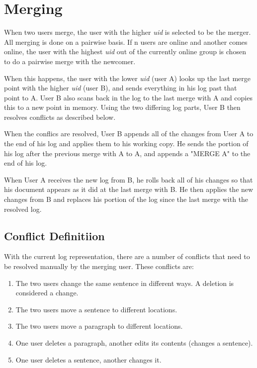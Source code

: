 \section{Merging}

When two users merge, the user with the higher \emph{uid} is selected to be
the merger. All merging is done on a pairwise basis. If n users are online 
and another comes online, the user with the highest \emph{uid} out of the currently
online group is chosen to do a pairwise merge with the newcomer.

When this happens, the user with the lower \emph{uid} (user A) looks up the last merge point
with the higher \emph{uid} (user B), and sends everything in his log past that point to
A. User B also scans back in the log to the last merge with A and copies this to a new point 
in memory. Using the two differing log parts, User B then resolves conflicts as described below.

When the conflics are resolved, User B appends all of the changes from User A to the end of his log
and applies them to his working copy. He sends the portion of his log after the previous merge with
A to A, and appends a "MERGE A" to the end of his log.

When User A receives the new log from B, he rolls back all of his changes so that his document appears
as it did at the last merge with B. He then applies the new changes from B and replaces his portion
of the log since the last merge with the resolved log.

\subsection{Conflict Definitiion}
With the current log representation, there are a number of conflicts that need to be resolved manually
by the merging user. These conflicts are:

\begin{enumerate}[1)]
\item The two users change the same sentence in different ways. A deletion is considered a change.

\item The two users move a sentence to different locations.

\item The two users move a paragraph to different locations.

\item One user deletes a paragraph, another edits its contents (changes a sentence).

\item One user deletes a sentence, another changes it.

\end{enumerate}

